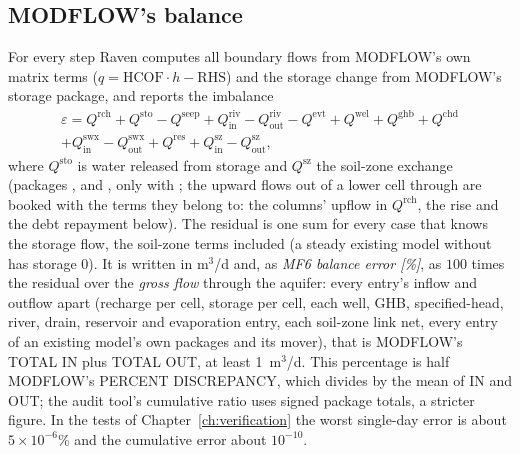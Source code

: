 \subsection{MODFLOW's balance}
For every step Raven computes all boundary flows from MODFLOW's own matrix terms ($q=\mathrm{HCOF}\cdot h-\mathrm{RHS}$)
and the storage change from MODFLOW's storage package, and reports the imbalance
\begin{multline}
\varepsilon=Q^{\mathrm{rch}}+Q^{\mathrm{sto}}-Q^{\mathrm{seep}}+Q^{\mathrm{riv}}_{\mathrm{in}}-Q^{\mathrm{riv}}_{\mathrm{out}}-Q^{\mathrm{evt}}
+Q^{\mathrm{wel}}+Q^{\mathrm{ghb}}+Q^{\mathrm{chd}}\\+Q^{\mathrm{swx}}_{\mathrm{in}}-Q^{\mathrm{swx}}_{\mathrm{out}}+Q^{\mathrm{res}}+Q^{\mathrm{sz}}_{\mathrm{in}}-Q^{\mathrm{sz}}_{\mathrm{out}},
\end{multline}
where $Q^{\mathrm{sto}}$ is water released from storage and $Q^{\mathrm{sz}}$ the soil-zone exchange (packages ,
 and , only with ; the upward flows out of a lower cell through
 are booked with the terms they belong to: the columns' upflow in $Q^{\mathrm{rch}}$, the rise and the
debt repayment below). The residual is one sum for every case that knows the storage flow, the soil-zone terms included
(a steady existing model without  has storage 0). It is written in m$^3$/d and, as \emph{MF6 balance error [\%]},
as $100$ times the residual over the \emph{gross flow} through the aquifer: every entry's inflow and outflow apart
(recharge per cell, storage per cell, each well, GHB, specified-head, river, drain, reservoir and evaporation entry, each
soil-zone link net, every entry of an existing model's own packages and its mover), that is MODFLOW's TOTAL IN plus TOTAL
OUT, at least 1~m$^3$/d. This percentage is half MODFLOW's PERCENT DISCREPANCY, which divides by the mean of IN and OUT; the
audit tool's cumulative ratio uses signed package totals, a stricter figure. In the tests of Chapter~\ref{ch:verification}
the worst single-day error is about $5\times10^{-6}$\% and the cumulative error about $10^{-10}$.


